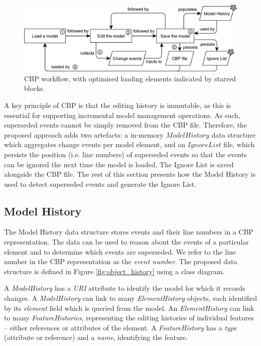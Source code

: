 \documentclass{llncs}
\begin{document}
    \vspace{-10pt}
    \begin{figure}[ht]
        \centering
        \includegraphics[width=\linewidth]{flowchart}
        \caption{CBP workflow, with optimised loading elements indicated by starred blocks.}
        \label{fig:flowchart}
    \end{figure}

    \vspace{-10pt}
    A key principle of CBP is that the editing history is immutable, as this is essential for supporting incremental model management operations. As such, superseded events cannot be simply removed from the CBP file. Therefore, the proposed approach adds two artefacts: a in-memory $Model History$ data structure which aggregates change events per model element, and an $Ignore List$ file, which persists the position (i.e. line numbers) of superseded events so that the events can be ignored the next time the model is loaded. The Ignore List is saved alongside the CBP file. The rest of this section presents how the Model History is used to detect superseded events and generate the Ignore List.
    
    \vspace{-10pt}
    \subsection{Model History}
    \label{subsec:model_history}
    The Model History data structure stores events and their line numbers in a CBP representation.  The data can be used to reason about the events of a particular element and to determine which events are superseded.  We refer to the line number in the CBP representation as the \emph{event number}. The proposed data structure is defined in Figure \ref{fig:object_history} using a class diagram.  
     
    A \emph{ModelHistory} has a \emph{URI} attribute to identify the model for which it records changes.  A \emph{ModelHistory} can link to many \emph{ElementHistory} objects, each identified by its \emph{element} field which is queried from the model. An \emph{ElementHistory} can link to many \emph{FeatureHistories}, representing the editing histories of individual features -- either references or attributes of the element. A \emph{FeatureHistory} has a \emph{type} (attribute or reference) and a \emph{name}, identifying the feature.
\end{document}

